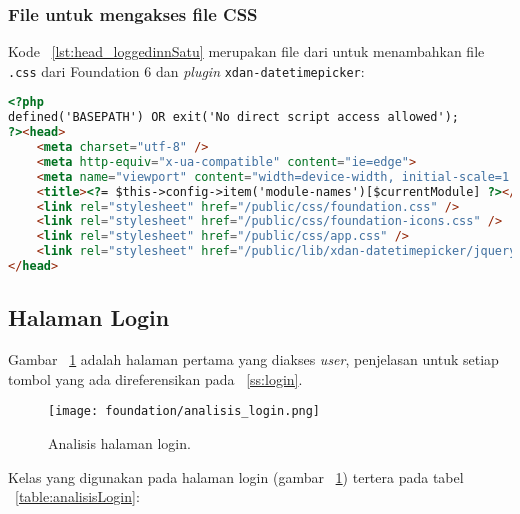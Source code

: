 \subsubsection{File untuk mengakses file CSS}
\noindent Kode ~\ref{lst:head_loggedinnSatu} merupakan file dari   untuk menambahkan file \texttt{.css} dari Foundation 6 dan \textit{plugin} \texttt{xdan-datetimepicker}:
\begin{lstlisting}[style=customhtml, language=HTML, caption=Penambahan library css, basicstyle=\footnotesize\ttfamily, frame=single,
columns=fullflexible, keepspaces=true, breaklines=true, showstringspaces=false, label={lst:head_loggedinnSatu}]
<?php
defined('BASEPATH') OR exit('No direct script access allowed');
?><head>
	<meta charset="utf-8" />
	<meta http-equiv="x-ua-compatible" content="ie=edge">
	<meta name="viewport" content="width=device-width, initial-scale=1.0" />
	<title><?= $this->config->item('module-names')[$currentModule] ?></title>
	<link rel="stylesheet" href="/public/css/foundation.css" />
	<link rel="stylesheet" href="/public/css/foundation-icons.css" />
	<link rel="stylesheet" href="/public/css/app.css" />
	<link rel="stylesheet" href="/public/lib/xdan-datetimepicker/jquery.datetimepicker.min.css" />
</head>
\end{lstlisting}

\subsection{Halaman Login}

\noindent Gambar ~\ref{fig:analisisLogin} adalah halaman pertama yang diakses \textit{user}, penjelasan untuk setiap tombol yang ada direferensikan pada ~\ref{ss:login}.

\begin{figure} [H]
	\centering  
	\texttt{[image: foundation/analisis\_login.png]} 
	\caption{Analisis halaman login.} 
	\label{fig:analisisLogin}
\end{figure} 

Kelas yang digunakan pada halaman login (gambar ~\ref{fig:analisisLogin}) tertera pada tabel ~\ref{table:analisisLogin}:\\

